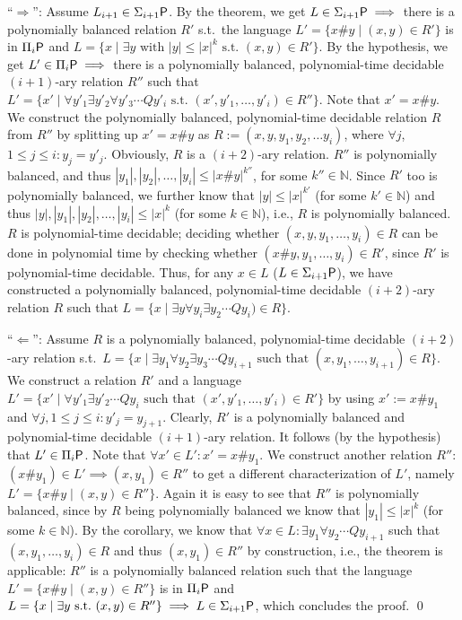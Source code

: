 \documentclass [11pt]{article}
\newcommand{\ccfont}[1]{\protect\mathsf{#1}}
\newcommand{\Ptime}{\ccfont{P}}
\newcommand{\phs}[1]{\Sigma_{#1}\Ptime}
\newcommand{\php}[1]{\Pi_{#1}\Ptime}
\begin{document}
``$\Rightarrow$'': Assume $L_{i+1} \in \phs{i+1}$.
By the theorem, we get $L \in \phs{i+1} \implies$ there is a polynomially balanced relation $R'$  s.t.\ the language $L' = \{x\#y \mid (x,y) \in R' \}$ is in $\php{i}$ and $L =\{x \mid \exists y \mbox{ with } |y| \leq |x|^k \mbox{ s.t.\ } (x,y) \in R'\}$. 
By the hypothesis, we get $L' \in \php{i} \implies $ there is a polynomially balanced, polynomial-time decidable $(i+1)$-ary relation $R''$ such that $L' = \{x' \mid \forall y'_1 \exists y'_2 \forall y'_3 \cdots Qy'_i \mbox { s.t.\ }(x', y'_1, \dots ,y'_i) \in R'' \}$. Note that $x' = x\#y$.
We construct the polynomially balanced, polynomial-time decidable relation $R$ from $R''$ by splitting up $x'=x\#y$ as $R := (x, y, y_1, y_2, \dots y_i)$, where $\forall j$, $1\leq j \leq i: y_j = y'_j$.
Obviously, $R$ is a $(i+2)$-ary relation. 
$R''$ is polynomially balanced, and thus $|y_1|, |y_2|,\dots ,|y_i| \leq |x\#y|^{k''}$, for some $k'' \in \mathbb{N}$.
Since $R'$ too is polynomially balanced, we further know that $|y| \leq |x|^{k'}$ (for some $k' \in \mathbb{N}$) and thus $|y|, |y_1|, |y_2|,\dots ,|y_i| \leq |x|^{k}$ (for some $k\in \mathbb{N}$), i.e., $R$ is polynomially balanced.
$R$ is polynomial-time decidable; deciding whether $(x, y, y_1,\dots ,y_i) \in R$ can be done in polynomial time by checking whether $(x\#y, y_1,\dots ,y_i) \in R'$, since $R'$ is polynomial-time decidable. 
Thus, for any $x \in L$ ($L \in \phs{i+1}$), we have constructed a polynomially balanced, polynomial-time decidable $(i+2)$-ary relation $R$ such that $L = \{x \mid \exists y \forall y_i \exists y_2\cdots Qy_i) \in R \}$.

``$\Leftarrow$'': Assume $R $ is a polynomially balanced, polynomial-time decidable $(i+2)$-ary relation s.t.\ $L = \{x \mid \exists y_1 \forall y_2 \exists y_3 \cdots Q y_{i+1}\mbox{ such that } (x, y_1, \dots, y_{i+1}) \in R \}$.
We construct a relation $R'$ and a language $L' = \{x' \mid \forall y'_1 \exists y'_2 \cdots Qy_i \mbox{ such that } (x',y'_1, \dots ,y'_i) \in R' \}$ by using $x':= x\#y_1$ and  $\forall j, 1\leq j \leq i: y'_j = y_{j+1}$. Clearly, $R'$ is a polynomially balanced and polynomial-time decidable $(i+1)$-ary relation. 
It follows (by the hypothesis) that $L' \in \php{i}$.
Note that $\forall x' \in L': x' = x\#y_1$.
We construct another relation $R''$: $(x\#y_1) \in L' \implies (x, y_1) \in R''$ to get a different characterization of $L'$, namely $L' = \{x\#y \mid (x, y) \in R'' \}$.
Again it is easy to see that $R''$ is polynomially balanced, since by $R$ being polynomially balanced we know that $|y_1| \leq |x|^k$ (for some $k\in \mathbb{N}$).
By the corollary, we know that $\forall x\in L : \exists y_1 \forall y_2 \cdots Qy_{i+1}$ such that $(x, y_1, \dots ,y_i) \in R$ and thus $(x, y_1) \in R''$ by construction, i.e.,  the theorem is applicable: $R''$ is a polynomially balanced relation such that the language $L' = \{x\#y \mid (x, y) \in R'' \}$ is in $\php{i}$ and $L = \{x \mid \exists y \mbox{ s.t.\ } (x, y) \in R'' \} \implies L \in \phs{i+1}$, which concludes the proof.
\qed
\end{document}
